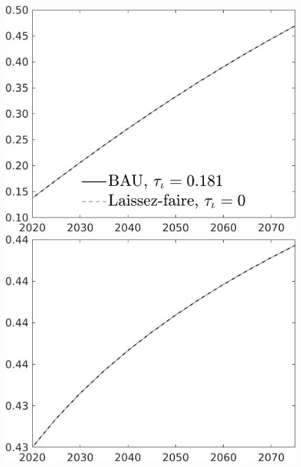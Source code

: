 \begin{figure}[h!!]
\begin{minipage}[]{0.32\textwidth}
\end{minipage}	
	\begin{minipage}[]{0.32\textwidth}
\includegraphics[width=1\textwidth]{../../codding_model/own_basedOnFried/optimalPol_010922_revision/figures/all_13Sept22/CompTaul_Equlab_LFBAU_Reg0_GFF_spillover0_nsk1_xgr1_knspil0_sep1_countec0_GovRev1_etaa0.79_lgd1.png}
\end{minipage}	
\begin{minipage}[]{0.32\textwidth}
\includegraphics[width=1\textwidth]{../../codding_model/own_basedOnFried/optimalPol_010922_revision/figures/all_13Sept22/CompTaul_Equlab_LFBAU_Reg0_EY_spillover0_nsk1_xgr1_knspil0_sep1_countec0_GovRev1_etaa0.79_lgd0.png}

\end{minipage}
\end{figure}
